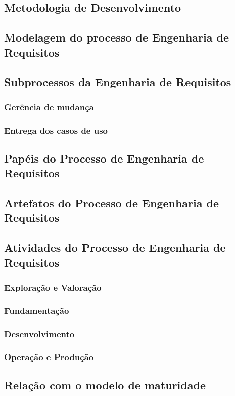   \subsection{Metodologia de Desenvolvimento}
  \subsection{Modelagem do processo de Engenharia de Requisitos}
  \subsection{Subprocessos da Engenharia de Requisitos}
    \subsubsection{Gerência de mudança}
    \subsubsection{Entrega dos casos de uso}
  \subsection{Papéis do Processo de Engenharia de Requisitos}
  \subsection{Artefatos do Processo de Engenharia de Requisitos}
  \subsection{Atividades do Processo de Engenharia de Requisitos}
    \subsubsection{Exploração e Valoração}
    \subsubsection{Fundamentação}
    \subsubsection{Desenvolvimento}
    \subsubsection{Operação e Produção}
  \subsection{Relação com o modelo de maturidade}

